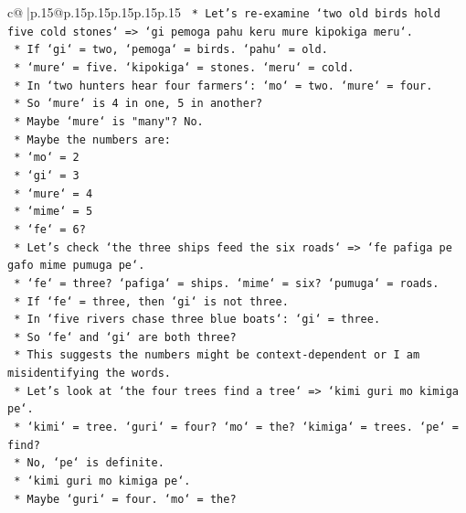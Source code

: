\documentclass{article}
\begin{document}
{\begin{supertabular}{c@{$\;$}|p{.15\linewidth}@{}p{.15\linewidth}p{.15\linewidth}p{.15\linewidth}p{.15\linewidth}p{.15\linewidth}}
{{{\texttt{                *   Let's re{-}examine `two old birds hold five cold stones` => `gi pemoga pahu keru mure kipokiga meru`.} \\
\texttt{                *   If `gi` = two, `pemoga` = birds. `pahu` = old.} \\
\texttt{                *   `mure` = five. `kipokiga` = stones. `meru` = cold.} \\
\texttt{                *   In `two hunters hear four farmers`: `mo` = two. `mure` = four.} \\
\texttt{                *   So `mure` is 4 in one, 5 in another?} \\
\texttt{                *   Maybe `mure` is "many"? No.} \\
\texttt{                *   Maybe the numbers are:} \\
\texttt{                    *   `mo` = 2} \\
\texttt{                    *   `gi` = 3} \\
\texttt{                    *   `mure` = 4} \\
\texttt{                    *   `mime` = 5} \\
\texttt{                    *   `fe` = 6?} \\
\texttt{                *   Let's check `the three ships feed the six roads` => `fe pafiga pe gafo mime pumuga pe`.} \\
\texttt{                *   `fe` = three? `pafiga` = ships. `mime` = six? `pumuga` = roads.} \\
\texttt{                *   If `fe` = three, then `gi` is not three.} \\
\texttt{                *   In `five rivers chase three blue boats`: `gi` = three.} \\
\texttt{                *   So `fe` and `gi` are both three?} \\
\texttt{                *   This suggests the numbers might be context{-}dependent or I am misidentifying the words.} \\
\texttt{                *   Let's look at `the four trees find a tree` => `kimi guri mo kimiga pe`.} \\
\texttt{                *   `kimi` = tree. `guri` = four? `mo` = the? `kimiga` = trees. `pe` = find?} \\
\texttt{                *   No, `pe` is definite.} \\
\texttt{                *   `kimi guri mo kimiga pe`.} \\
\texttt{                *   Maybe `guri` = four. `mo` = the?} \\
}}}
\end{supertabular}}
\end{document}
